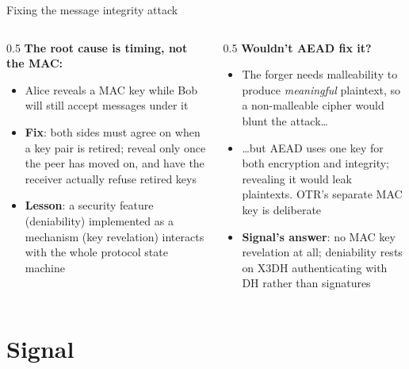 \ifdefined\PRESENTATION\else\PassOptionsToClass{handout}{beamer}\fi\documentclass[aspectratio=169, lualatex]{beamer}
\begin{document}
\begin{frame}{Fixing the message integrity attack}
	\begin{columns}
		\begin{column}{0.5\textwidth}
			\textbf{The root cause is timing, not the MAC:}
			\begin{itemize}
				\item Alice reveals a MAC key while Bob will still accept messages under it
				\item \textbf{Fix}: both sides must agree on when a key pair is retired; reveal only once the peer has moved on, and have the receiver actually refuse retired keys
				\item \textbf{Lesson}: a security feature (deniability) implemented as a mechanism (key revelation) interacts with the whole protocol state machine
			\end{itemize}
		\end{column}
		\begin{column}{0.5\textwidth}
			\textbf{Wouldn't AEAD fix it?}
			\begin{itemize}
				\item The forger needs malleability to produce \textit{meaningful} plaintext, so a non-malleable cipher would blunt the attack\ldots
				\item \ldots but AEAD uses one key for both encryption and integrity; revealing it would leak plaintexts. OTR's separate MAC key is deliberate
				\item \textbf{Signal's answer}: no MAC key revelation at all; deniability rests on X3DH authenticating with DH rather than signatures
			\end{itemize}
		\end{column}
	\end{columns}
\end{frame}

\section{Signal}
\end{document}
